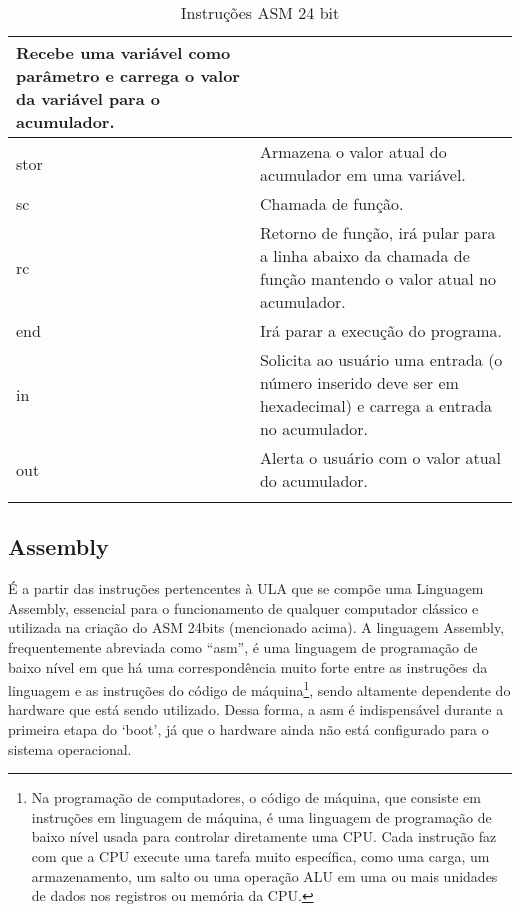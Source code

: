 \begin{longtable}{ |p{3cm}||p{11cm}|  }
  Recebe uma variável como parâmetro e carrega o valor da variável para o acumulador. \\
  \hline
  stor &
  Armazena o valor atual do acumulador em uma variável. \\
  \hline
  sc &
  Chamada de função. \\
  \hline
  rc &
  Retorno de função, irá pular para a linha abaixo da chamada de função mantendo o valor atual no acumulador. \\
  \hline
  end &
  Irá parar a execução do programa. \\
  \hline
  in &
  Solicita ao usuário uma entrada (o número inserido deve ser em hexadecimal) e carrega a entrada no acumulador. \\
  \hline
  out &
  Alerta o usuário com o valor atual do acumulador. \\
  \hline
  \caption{Instruções ASM 24 bit}
  \label{table:2}
\end{longtable}
\vspace{1cm}


\subsection{Assembly}

É a partir das instruções pertencentes à ULA que se compõe uma  Linguagem Assembly, essencial para o funcionamento de qualquer computador clássico e utilizada na criação do ASM 24bits (mencionado acima). A linguagem Assembly, frequentemente abreviada como ``asm'', é uma linguagem de programação de baixo nível em que há uma correspondência muito forte entre as instruções da linguagem e as instruções do código de máquina\footnote{Na programação de computadores, o código de máquina, que consiste em instruções em linguagem de máquina, é uma linguagem de programação de baixo nível usada para controlar diretamente uma CPU. Cada instrução faz com que a CPU execute uma tarefa muito específica, como uma carga, um armazenamento, um salto ou uma operação ALU em uma ou mais unidades de dados nos registros ou memória da CPU.}, sendo altamente dependente do hardware que está sendo utilizado. Dessa forma, a asm é indispensável durante a primeira etapa do `boot', já que o hardware ainda não está configurado para o sistema operacional. 

